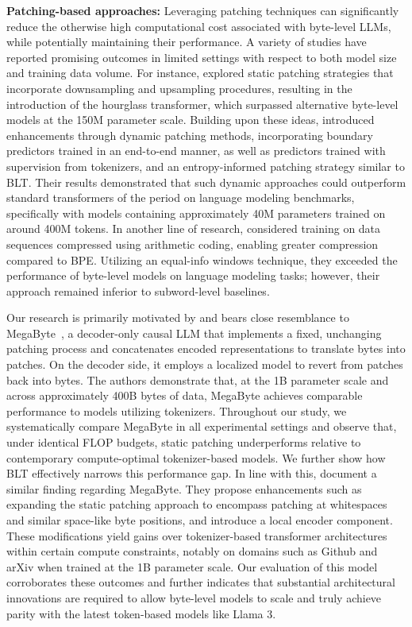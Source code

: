 \textbf{Patching-based approaches:} Leveraging patching techniques can significantly reduce the otherwise high computational cost associated with byte-level LLMs, while potentially maintaining their performance. A variety of studies have reported promising outcomes in limited settings with respect to both model size and training data volume. For instance, \cite{nawrot-etal-2022-hierarchical} explored static patching strategies that incorporate downsampling and upsampling procedures, resulting in the introduction of the hourglass transformer, which surpassed alternative byte-level models at the 150M parameter scale. Building upon these ideas, \cite{nawrot-etal-2023-efficient} introduced enhancements through dynamic patching methods, incorporating boundary predictors trained in an end-to-end manner, as well as predictors trained with supervision from tokenizers, and an entropy-informed patching strategy similar to {\textsc BLT}. Their results demonstrated that such dynamic approaches could outperform standard transformers of the period on language modeling benchmarks, specifically with models containing approximately 40M parameters trained on around 400M tokens. In another line of research, \cite{lester2024training} considered training on data sequences compressed using arithmetic coding, enabling greater compression compared to BPE. Utilizing an equal-info windows technique, they exceeded the performance of byte-level models on language modeling tasks; however, their approach remained inferior to subword-level baselines.

Our research is primarily motivated by and bears close resemblance to MegaByte~\citep{yu2023megabyte}, a decoder-only causal LLM that implements a fixed, unchanging patching process and concatenates encoded representations to translate bytes into patches. On the decoder side, it employs a localized model to revert from patches back into bytes. The authors demonstrate that, at the 1B parameter scale and across approximately 400B bytes of data, MegaByte achieves comparable performance to models utilizing tokenizers. Throughout our study, we systematically compare MegaByte in all experimental settings and observe that, under identical FLOP budgets, static patching underperforms relative to contemporary compute-optimal tokenizer-based models. We further show how {\textsc BLT} effectively narrows this performance gap. In line with this, \cite{slagle2024spacebyte} document a similar finding regarding MegaByte. They propose enhancements such as expanding the static patching approach to encompass patching at whitespaces and similar space-like byte positions, and introduce a local encoder component. These modifications yield gains over tokenizer-based transformer architectures within certain compute constraints, notably on domains such as Github and arXiv when trained at the 1B parameter scale. Our evaluation of this model corroborates these outcomes and further indicates that substantial architectural innovations are required to allow byte-level models to scale and truly achieve parity with the latest token-based models like Llama 3.

